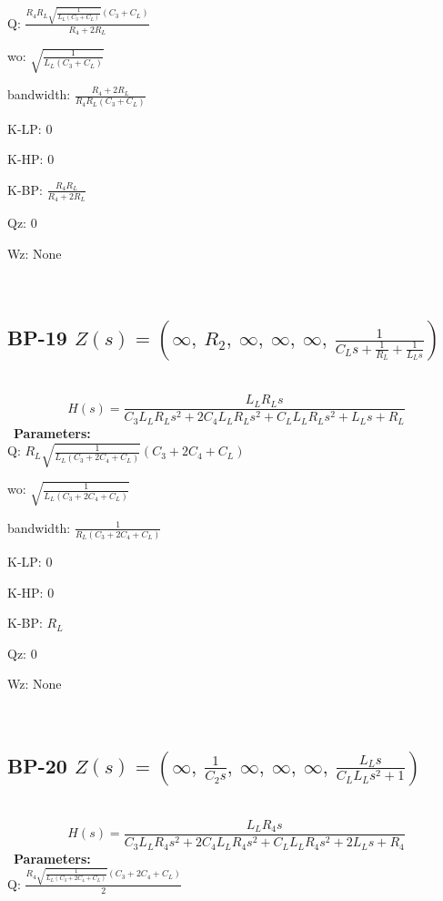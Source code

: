 \documentclass{article}
\begin{document}
Q: $\frac{R_{4} R_{L} \sqrt{\frac{1}{L_{L} \left(C_{3} + C_{L}\right)}} \left(C_{3} + C_{L}\right)}{R_{4} + 2 R_{L}}$\ 

wo: $\sqrt{\frac{1}{L_{L} \left(C_{3} + C_{L}\right)}}$\ 

bandwidth: $\frac{R_{4} + 2 R_{L}}{R_{4} R_{L} \left(C_{3} + C_{L}\right)}$\ 

K-LP: $0$\ 

K-HP: $0$\ 

K-BP: $\frac{R_{4} R_{L}}{R_{4} + 2 R_{L}}$\ 

Qz: $0$\ 

Wz: $\text{None}$\ 

\ 

\subsection{BP-19 $Z(s) = \left( \infty, \  R_{2}, \  \infty, \  \infty, \  \infty, \  \frac{1}{C_{L} s + \frac{1}{R_{L}} + \frac{1}{L_{L} s}}\right)$ } \ 
\textbf{\[H(s) = \frac{L_{L} R_{L} s}{C_{3} L_{L} R_{L} s^{2} + 2 C_{4} L_{L} R_{L} s^{2} + C_{L} L_{L} R_{L} s^{2} + L_{L} s + R_{L}}\] } \ 
\textbf{Parameters:}\\ 

Q: $R_{L} \sqrt{\frac{1}{L_{L} \left(C_{3} + 2 C_{4} + C_{L}\right)}} \left(C_{3} + 2 C_{4} + C_{L}\right)$\ 

wo: $\sqrt{\frac{1}{L_{L} \left(C_{3} + 2 C_{4} + C_{L}\right)}}$\ 

bandwidth: $\frac{1}{R_{L} \left(C_{3} + 2 C_{4} + C_{L}\right)}$\ 

K-LP: $0$\ 

K-HP: $0$\ 

K-BP: $R_{L}$\ 

Qz: $0$\ 

Wz: $\text{None}$\ 

\ 

\subsection{BP-20 $Z(s) = \left( \infty, \  \frac{1}{C_{2} s}, \  \infty, \  \infty, \  \infty, \  \frac{L_{L} s}{C_{L} L_{L} s^{2} + 1}\right)$ } \ 
\textbf{\[H(s) = \frac{L_{L} R_{4} s}{C_{3} L_{L} R_{4} s^{2} + 2 C_{4} L_{L} R_{4} s^{2} + C_{L} L_{L} R_{4} s^{2} + 2 L_{L} s + R_{4}}\] } \ 
\textbf{Parameters:}\\ 

Q: $\frac{R_{4} \sqrt{\frac{1}{L_{L} \left(C_{3} + 2 C_{4} + C_{L}\right)}} \left(C_{3} + 2 C_{4} + C_{L}\right)}{2}$\ 
\end{document}
